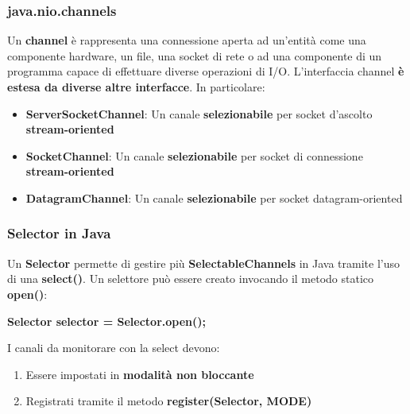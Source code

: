 \documentclass[12pt]{article}
\begin{document}
\subsubsection{java.nio.channels}
Un \textbf{channel} è rappresenta una connessione aperta ad un'entità come una componente hardware, un file, una socket di rete o ad una componente di un programma capace di effettuare diverse operazioni di I/O. L'interfaccia channel \textbf{è estesa da diverse altre interfacce}. In particolare:
\begin{itemize}
    \item \textbf{ServerSocketChannel}: Un canale \textbf{selezionabile} per socket d'ascolto \textbf{stream-oriented}
    \item \textbf{SocketChannel}: Un canale \textbf{selezionabile} per socket di connessione \textbf{stream-oriented}
    \item \textbf{DatagramChannel}:  Un canale \textbf{selezionabile} per socket datagram-oriented
\end{itemize}
\subsubsection{Selector in Java}
Un \textbf{Selector} permette di gestire più \textbf{SelectableChannels} in Java tramite l'uso di una \textbf{select()}. Un selettore può essere creato invocando il metodo statico \textbf{open()}:
\begin{center}
    \textbf{Selector selector = Selector.open();}
\end{center}
I canali da monitorare con la select devono:
\begin{enumerate}
    \item Essere impostati in \textbf{modalità non bloccante}
    \item Registrati tramite il metodo \textbf{register(Selector, MODE)}
\end{enumerate}
\end{document}
